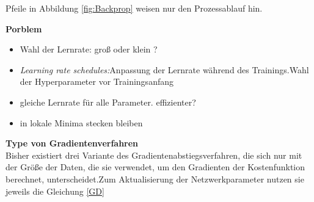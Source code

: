 \documentclass[12pt,a4paper]{scrartcl}
\numberwithin{equation}{section}
\begin{document}
Pfeile in Abbildung \ref{fig:Backprop} weisen nur den Prozessablauf hin.

\textbf{Porblem}
\begin{itemize}
	\item Wahl der Lernrate: groß oder klein ?
	\item \textit{Learning rate schedules:}Anpassung der Lernrate während des Trainings.Wahl der Hyperparameter vor Trainingsanfang
	\item gleiche Lernrate für alle Parameter. effizienter?
	\item in lokale Minima stecken bleiben	
\end{itemize}

\textbf{Type von Gradientenverfahren}\\
Bisher existiert drei Variante des Gradientenabstiegsverfahren, die sich nur mit der Größe der Daten, die sie verwendet, um den Gradienten der Kostenfunktion berechnet, unterscheidet.Zum Aktualisierung der Netzwerkparameter nutzen sie jeweils die Gleichung \eqref{GD} 
\end{document}
